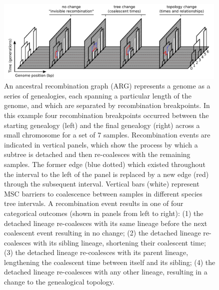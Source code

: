 \documentclass[11pt]{article}
\begin{document}
\begin{figure}[t]
	\centering
	\includegraphics[width=0.99\textwidth]{figures/Fig2-recomb-types-ARG.pdf}
	\caption{
		An ancestral recombination graph (ARG) represents a genome
		as a series of genealogies, each spanning a particular length of
		the genome,  
		and which are separated by recombination breakpoints. 
		In this example four recombination breakpoints occurred between the 
		starting genealogy (left) and the final genealogy (right) across a 
		small chromosome for a set of 7 samples. Recombination
		events are indicated in vertical panels, which show the process 
		by which a subtree is detached and then re-coalesces with the 
		remaining samples. The former edge (blue dotted) which existed throughout
		the interval to the left of the panel is replaced by a new edge (red)
		through the subsequent interval. Vertical bars (white) represent 
		MSC barriers to coalescence between samples in different
		species tree intervals.
		A recombination event results in one of four categorical outcomes
		(shown in panels from left to right):
		(1) the detached lineage re-coalesces with its same lineage
		before the next coalescent event resulting in no change; 
		(2) the detached lineage re-coalesces with its sibling lineage,
		shortening their coalescent time;
		(3) the detached lineage re-coalesces with its parent lineage,
		lengthening the coalescent time between itself and its sibling;
		(4) the detached lineage re-coalesces with any other lineage,
		resulting in a change to the genealogical topology.
}
\label{fig:fig2}
\end{figure}
\end{document}
